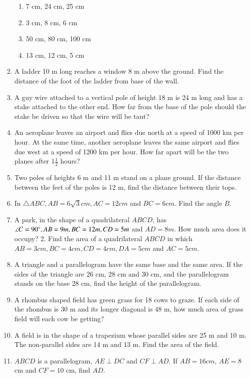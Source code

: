 \begin{enumerate}[label=\thesection.\arabic*.,ref=\thesection.\theenumi]
\begin{enumerate}
\item  7 cm, 24 cm, 25 cm 
\item  3 cm, 8 cm, 6 cm 
\item  50 cm, 80 cm, 100 cm 
\item  13 cm, 12 cm, 5 cm
\end{enumerate}
\item  A ladder 10 m long reaches a window 8 m above the ground. Find the distance of the foot of the ladder from base of the wall.
\item  A guy wire attached to a vertical pole of height 18 m is 24 m long and has a stake attached to the other end. How far from the base of the pole should the stake be driven so that the wire will be taut?
\item  An aeroplane leaves an airport and flies due north at a speed of 1000 km per hour. At the same time, another aeroplane leaves the same airport and flies due west at a speed of 1200 km per hour. How far apart will be the two planes after $1\frac{1}{2}$ hours?
\item  Two poles of heights 6 m and 11 m stand on a plane ground. If the distance between the feet of the poles is 12 m, find the distance between their tops.
\item  In  $\triangle  ABC, AB = 6\sqrt{3} cm, AC = 12 cm$ and $BC = 6 cm$. Find the angle $B$.
%
\item A park, in the shape of a quadrilateral $ABCD$, has $\angle C = 90\degree, AB = 9 m, BC = 12 m, CD = 5 m$ and $ AD = 8 m$. How much area does it occupy?
2. Find the area of a quadrilateral $ABCD$ in which $AB = 3 cm, BC = 4 cm, CD = 4 cm, DA = 5 cm$ and $AC = 5 cm$.
\item A triangle and a parallelogram have the same base and the same area. If the sides of the triangle are 26 cm, 28 cm and 30 cm, and the parallelogram stands on the base 28 cm, find the height of the parallelogram.
\item A rhombus shaped field has green grass for 18 cows to graze. If each side of the rhombus is 30 m and its longer diagonal is 48 m, how much area of grass field will each cow be getting?
\item A field is in the shape of a trapezium whose parallel sides are 25 m and 10 m. The non-parallel sides are 14 m and 13 m. Find the area of the field.
%
\item $ABCD$ is a parallelogram, $AE  \perp  DC$ and $CF  \perp  AD$. If $AB = 16 cm$, $AE = 8$ cm and $CF = 10$ cm, find $AD$.

\end{enumerate}
